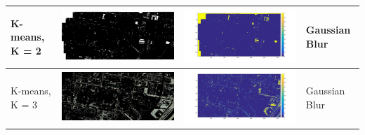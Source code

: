 \documentclass[fleqn,10pt]{SelfArx} %
\begin{document}
\begin{table}
\begin{tabular}{>{\centering\arraybackslash}M{8mm}cc>{\centering\arraybackslash}M{20mm}}
K-means, K = 2 & \includegraphics[clip,scale=0.07]{2rgb.jpg} & \includegraphics[trim={6cm 2.5cm 4.5cm 1.6cm},clip,scale=0.18]{2.jpg} & \vspace{-3cm}Gaussian Blur \\ 
\midrule 
\vspace{-3cm}
\hspace{-0.6cm}
K-means, K = 3 & \includegraphics[clip,scale=0.07]{3rgb.jpg} & \includegraphics[trim={6cm 2.5cm 4.5cm 1.6cm},clip,scale=0.18]{3.jpg} & \vspace{-3cm}Gaussian Blur \\ 

\end{tabular}
\end{table}
\end{document}

